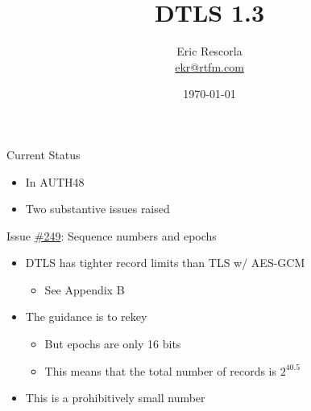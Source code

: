 \documentclass[helvetica]{beamer}
\title{DTLS 1.3}
\author{Eric Rescorla \\\url{ekr@rtfm.com}}
\date{\today}
\begin{document}
\begin{frame}
  \titlepage
\end{frame}

\begin{frame}{Current Status}

  \begin{itemize}
  \item In AUTH48
  \item Two substantive issues raised
  \end{itemize}
\end{frame}

\begin{frame}{Issue \href{https://github.com/tlswg/dtls13-spec/issues/249}{\#249}: Sequence numbers and epochs}

  \begin{itemize}
  \item DTLS has tighter record limits than TLS w/ AES-GCM
    \begin{itemize}
    \item See Appendix B      
    \end{itemize}

  \item The guidance is to rekey
    \begin{itemize}
    \item But epochs are only 16 bits
    \item This means that the total number of records is $2^{40.5}$     
    \end{itemize}

  \item This is a prohibitively small number    
  \end{itemize}
\end{frame}
\end{document}
